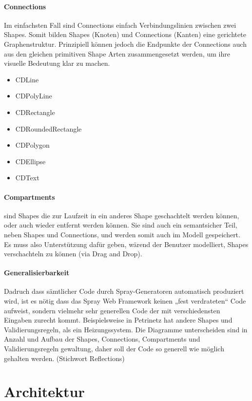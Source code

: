\paragraph{Connections}

Im einfachsten Fall sind Connections einfach Verbindungslinien zwischen
zwei Shapes. Somit bilden Shapes (Knoten) und Connections (Kanten)
eine gerichtete Graphenstruktur.
Prinzipiell können jedoch die Endpunkte der Connections auch aus den gleichen
primitiven Shape Arten zusammengesetzt werden, um ihre visuelle Bedeutung
klar zu machen.

\begin{itemize}
  \item CDLine
  \item CDPolyLine
  \item CDRectangle
  \item CDRoundedRectangle
  \item CDPolygon
  \item CDEllipse
  \item CDText
\end{itemize}

\paragraph{Compartments}
sind Shapes die zur Laufzeit in ein anderes Shape geschachtelt werden können,
oder auch wieder entfernt werden können. Sie sind auch ein semantsicher Teil,
neben Shapes und Connections, und werden somit auch im Modell gespeichert.
Es muss also Unterstützung dafür geben, wärend der Benutzer modelliert, Shapes
verschachteln zu können (via Drag and Drop).


\paragraph{Generalisierbarkeit}
Dadruch dass sämtlicher Code durch Spray-Generatoren automatisch produziert wird,
ist es nötig dass das Spray Web Framework keinen „fest verdrateten“ Code
aufweist, sondern vielmehr sehr generellen Code der mit verschiedensten
Eingaben zurecht kommt.
Beispielsweise in Petrinetz hat andere Shapes und Validierungsregeln,
als ein Heizungssystem. Die Diagramme unterscheiden sind in Anzahl und
Aufbau der Shapes, Connections, Compartments und Validierungsregeln
gewaltung, daher soll der Code so generell wie möglich gehalten werden.
(Stichwort Reflections)



\section{Architektur}
